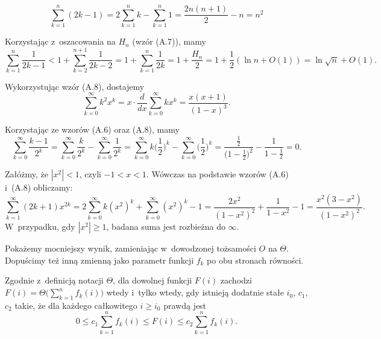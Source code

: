 
\exercise %
\[
	\sum_{k=1}^n(2k-1) = 2\sum_{k=1}^nk-\sum_{k=1}^n1 = \frac{2n(n+1)}{2}-n = n^2
\]

\exercise %
Korzystając z~oszacowania na $H_n$ (wzór (A.7)), mamy
\[
    \sum_{k=1}^n\frac{1}{2k-1} < 1+\sum_{k=2}^{n+1}\frac{1}{2k-2} = 1+\sum_{k=1}^n\frac{1}{2k} = 1+\frac{H_n}{2} = 1+\frac{1}{2}(\ln n+O(1)) = \ln\sqrt{n}+O(1).
\]

\exercise %
Wykorzystując wzór (A.8), dostajemy
\[
	\sum_{k=0}^\infty k^2x^k = x\cdot\frac{d}{dx}\sum_{k=0}^\infty kx^k = \frac{x(x+1)}{(1-x)^3}.
\]

\exercise %
Korzystając ze wzorów (A.6) oraz (A.8), mamy
\[
	\sum_{k=0}^\infty\frac{k-1}{2^k} = \sum_{k=0}^\infty\frac{k}{2^k}-\sum_{k=0}^\infty\frac{1}{2^k} = \sum_{k=0}^\infty k\biggl(\frac{1}{2}\biggr)^k-\sum_{k=0}^\infty\biggl(\frac{1}{2}\biggr)^k = \frac{\frac{1}{2}}{\bigl(1-\frac{1}{2}\bigr)^2}-\frac{1}{1-\frac{1}{2}} = 0.
\]

\exercise %
Załóżmy, że $|x^2|<1$, czyli $-1<x<1$.
Wówczas na podstawie wzorów (A.6) i~(A.8) obliczamy:
\[
	\sum_{k=1}^\infty(2k+1)x^{2k} = 2\sum_{k=0}^\infty k(x^2)^k+\sum_{k=0}^\infty(x^2)^k-1 = \frac{2x^2}{(1-x^2)^2}+\frac{1}{1-x^2}-1 = \frac{x^2(3-x^2)}{(1-x^2)^2}.
\]
W~przypadku, gdy $|x^2|\ge1$, badana suma jest rozbieżna do $\infty$.

\exercise %
Pokażemy mocniejszy wynik, zamieniając w~dowodzonej tożsamości $O$ na $\Theta$.
Dopuścimy też inną zmienną jako parametr funkcji $f_k$ po obu stronach równości.

Zgodnie z~definicją notacji $\Theta$, dla dowolnej funkcji $F(i)$ zachodzi $F(i)=\Theta\bigl(\sum_{k=1}^nf_k(i)\bigr)$ wtedy i~tylko wtedy, gdy istnieją dodatnie stałe $i_0$, $c_1$, $c_2$ takie, że dla każdego całkowitego $i\ge i_0$ prawdą jest
\[
	0 \le c_1\sum_{k=1}^nf_k(i) \le F(i) \le c_2\sum_{k=1}^nf_k(i).
\]

